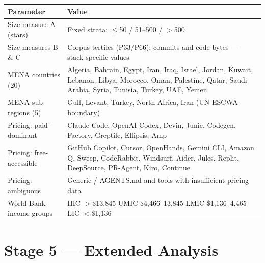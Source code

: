 \documentclass[9.5pt,a4paper]{article}
\begin{document}
\begin{tabular}{@{}p{5cm} p{11.2cm}@{}}
\toprule
\textbf{Parameter} & \textbf{Value} \\
\midrule
\rowcolor{rowgray}

Size measure A (stars) & Fixed strata: $\leq$50 / 51--500 / $>$500 \\
\rowcolor{rowgray}
Size measures B \& C & Corpus tertiles (P33/P66): commits and code bytes --- stack-specific values \\

\rowcolor{rowgray}
MENA countries (20) &
  Algeria, Bahrain, Egypt, Iran, Iraq, Israel, Jordan, Kuwait, Lebanon, Libya,
  Morocco, Oman, Palestine, Qatar, Saudi Arabia, Syria, Tunisia, Turkey, UAE, Yemen \\
MENA sub-regions (5) & Gulf, Levant, Turkey, North Africa, Iran \quad (UN ESCWA boundary) \\
\rowcolor{rowgray}
Pricing: paid-dominant &
  Claude Code, OpenAI Codex, Devin, Junie, Codegen, Factory, Greptile, Ellipsis, Amp \\
Pricing: free-accessible &
  GitHub Copilot, Cursor, OpenHands, Gemini CLI, Amazon Q, Sweep, CodeRabbit,
  Windsurf, Aider, Jules, Replit, DeepSource, PR-Agent, Kiro, Continue \\
\rowcolor{rowgray}
Pricing: ambiguous & Generic / AGENTS.md and tools with insufficient pricing data \\
World Bank income groups &
  HIC $>$\$13,845 \quad UMIC \$4,466--13,845 \quad LMIC \$1,136--4,465 \quad LIC $<$\$1,136 \\

\bottomrule
\end{tabular}




\section{Stage 5 — Extended Analysis}
\end{document}
